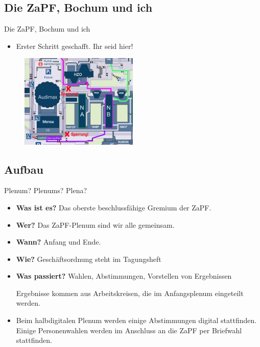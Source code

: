 \documentclass[compress,]{beamer}
\begin{document}

\subsection{Die ZaPF, Bochum und ich}
\begin{frame}{Die ZaPF, Bochum und ich}
  \begin{itemize}[<+->]
  \item Erster Schritt geschafft. Ihr seid hier!
  \end{itemize}

  \begin{figure}
    \centering
    \includegraphics[width=0.5\textwidth]{KarteBochum.png}

  \end{figure}

\end{frame}


\subsection{Aufbau}

\begin{frame}{Plenum? Plenums? Plena?}

  \begin{itemize}[<+->]
  \item \textbf{Was ist es?} Das oberste beschlussfähige Gremium der ZaPF.
  \item \textbf{Wer?} Das ZaPF-Plenum sind wir alle gemeinsam.
  \item \textbf{Wann?} Anfang und Ende.
  \item \textbf{Wie?} Geschäftsordnung steht im Tagungsheft
  \item \textbf{Was passiert?} Wahlen, Abstimmungen, Vorstellen von Ergebnissen

    Ergebnisse kommen aus Arbeitskreisen, die im Anfangsplenum eingeteilt werden.
  \item Beim halbdigitalen Plenum werden einige Abstimmungen digital stattfinden. Einige Personenwahlen werden im Anschluss an die ZaPF per Briefwahl stattfinden.
  \end{itemize}


\end{frame}
\end{document}
